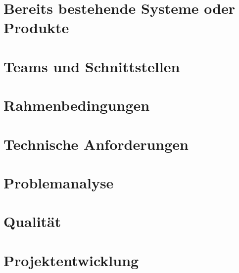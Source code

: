 \documentclass[12pt]{scrartcl}
\begin{document}
\section{Bereits bestehende Systeme oder Produkte}
\section{Teams und Schnittstellen}
\section{Rahmenbedingungen}
\section{Technische Anforderungen}
\section{Problemanalyse}
\section{Qualität}
\section{Projektentwicklung}

		
\end{document}
